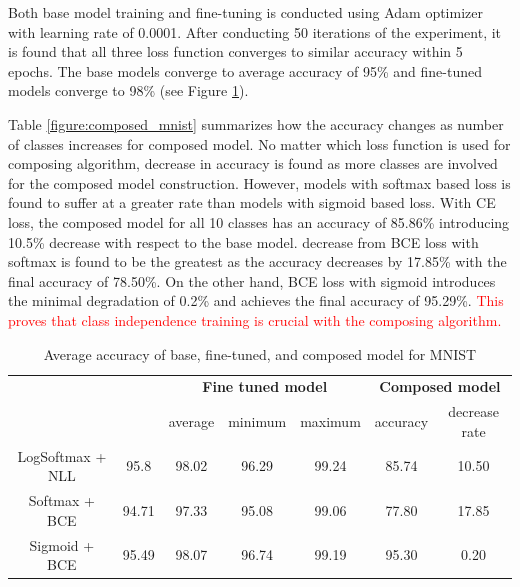 \documentclass{article}
\newcommand{\red}[1]{\textcolor{red}{#1}}
\begin{document}
Both base model training and fine-tuning is conducted using Adam optimizer with learning rate of 0.0001. After conducting 50 iterations of the experiment, it is found that all three loss function converges to similar accuracy within 5 epochs. The base models converge to average accuracy of 95\% and fine-tuned models converge to 98\% (see Figure \ref{table:mnist}).

Table \ref{figure:composed_mnist} summarizes how the accuracy changes as number of classes increases for composed model. No matter which loss function is used for composing algorithm, decrease in accuracy is found as more classes are involved for the composed model construction. However, models with softmax based loss is found to suffer at a greater rate than models with sigmoid based loss. With CE loss, the composed model for all 10 classes has an accuracy of 85.86\% introducing 10.5\% decrease with respect to the base model. decrease from BCE loss with softmax is found to be the greatest as the accuracy decreases by 17.85\% with the final accuracy of 78.50\%. On the other hand, BCE loss with sigmoid introduces the minimal degradation of 0.2\% and achieves the final accuracy of 95.29\%. \red{This proves that class independence training is crucial with the composing algorithm.}

\begin{table}[t]
    \centering
    \begin{tabular}{ccccccc}
        \toprule[1pt]
        \multirow{2}{*}{\raisebox{-3\heavyrulewidth}{\bf Loss function}} &
        \multirow{2}{*}{\raisebox{-3\heavyrulewidth}{\bf Base model}} &
        \multicolumn{3}{c}{\bf Fine tuned model } &
        \multicolumn{2}{c}{\bf Composed model } \\
        \cmidrule(lr){3-5}
        \cmidrule(lr){6-7}
        & & average & minimum & maximum & accuracy & decrease rate \\
        \midrule
        LogSoftmax + NLL & 95.8 & 98.02 & 96.29 & 99.24 & 85.74 & 10.50 \\
        Softmax + BCE & 94.71 & 97.33 & 95.08 & 99.06 & 77.80 & 17.85 \\
        Sigmoid + BCE & 95.49 & 98.07 & 96.74 & 99.19 & 95.30 & 0.20 \\
        \bottomrule[1pt]
    \end{tabular}
    \caption{Average accuracy of base, fine-tuned, and composed model for MNIST}
    \label{table:mnist}
\end{table}
\end{document}
